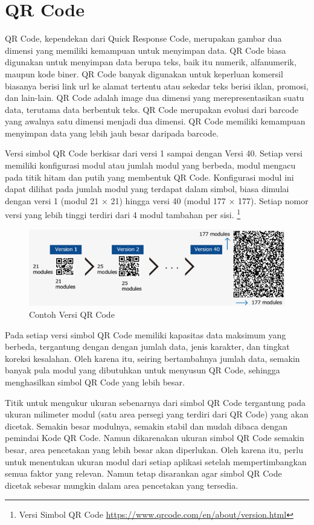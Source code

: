\cite{pressman2019software}

\section{QR Code}
QR Code, kependekan dari Quick Response Code, merupakan gambar dua dimensi yang memiliki kemampuan untuk menyimpan data. QR Code biasa digunakan untuk menyimpan data berupa teks, baik itu numerik, alfanumerik, maupun kode biner. QR Code banyak digunakan untuk keperluan komersil biasanya berisi link url ke alamat tertentu atau sekedar teks berisi iklan, promosi, dan lain-lain. QR Code adalah image dua dimensi yang merepresentasikan suatu data, terutama data berbentuk teks. QR Code merupakan evolusi dari barcode yang awalnya satu dimensi menjadi dua dimensi. QR Code memiliki kemampuan menyimpan data yang
lebih jauh besar daripada barcode.

Versi simbol QR Code berkisar dari versi 1 sampai dengan Versi 40. Setiap versi memiliki konfigurasi modul atau jumlah modul yang berbeda, modul mengacu pada titik hitam dan putih yang membentuk QR Code.
Konfigurasi modul ini dapat dilihat pada jumlah modul yang terdapat dalam simbol, biasa dimulai dengan versi 1 (modul 21 × 21) hingga versi 40 (modul 177 × 177). Setiap nomor versi yang lebih tinggi terdiri dari 4 modul tambahan per sisi. \footnote{Versi Simbol QR Code \url{https://www.qrcode.com/en/about/version.html}}

\begin{figure}[H]
	\centering
	\includegraphics[scale=1]{Gambar/versiQR.png}
	\caption{Contoh Versi QR Code} 
	\label{fig:versiQR}
\end{figure}

Pada setiap versi simbol QR Code memiliki kapasitas data maksimum yang berbeda, tergantung dengan dengan jumlah data, jenis karakter, dan tingkat koreksi kesalahan. Oleh karena itu, seiring bertambahnya jumlah data, semakin banyak pula modul yang dibutuhkan untuk menyusun QR Code, sehingga menghasilkan simbol QR Code yang lebih besar.

Titik untuk mengukur ukuran sebenarnya dari simbol QR Code tergantung pada ukuran milimeter modul (satu area persegi yang terdiri dari QR Code) yang akan dicetak. Semakin besar modulnya, semakin stabil dan mudah dibaca dengan pemindai Kode QR Code. Namun dikarenakan ukuran simbol QR Code semakin besar, area pencetakan yang lebih besar akan diperlukan. Oleh karena itu, perlu untuk menentukan ukuran modul dari setiap aplikasi setelah mempertimbangkan semua faktor yang relevan. Namun tetap disarankan agar simbol QR Code dicetak sebesar mungkin dalam area pencetakan yang tersedia.

